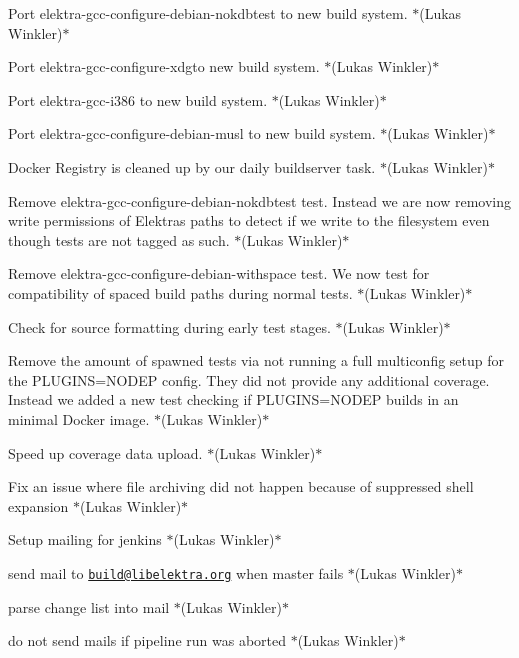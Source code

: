 \begin{DoxyItemize}
\item Port {\ttfamily elektra-\/gcc-\/configure-\/debian-\/nokdbtest} to new build system. $\ast$(Lukas Winkler)$\ast$
\item Port {\ttfamily elektra-\/gcc-\/configure-\/xdg}to new build system. $\ast$(Lukas Winkler)$\ast$
\item Port {\ttfamily elektra-\/gcc-\/i386} to new build system. $\ast$(Lukas Winkler)$\ast$
\item Port {\ttfamily elektra-\/gcc-\/configure-\/debian-\/musl} to new build system. $\ast$(Lukas Winkler)$\ast$
\item Docker Registry is cleaned up by our daily buildserver task. $\ast$(Lukas Winkler)$\ast$
\item Remove {\ttfamily elektra-\/gcc-\/configure-\/debian-\/nokdbtest} test. Instead we are now removing write permissions of Elektra\textquotesingle{}s paths to detect if we write to the filesystem even though tests are not tagged as such. $\ast$(Lukas Winkler)$\ast$
\item Remove {\ttfamily elektra-\/gcc-\/configure-\/debian-\/withspace} test. We now test for compatibility of spaced build paths during normal tests. $\ast$(Lukas Winkler)$\ast$
\item Check for source formatting during early test stages. $\ast$(Lukas Winkler)$\ast$
\item Remove the amount of spawned tests via not running a full multiconfig setup for the {\ttfamily P\+L\+U\+G\+I\+NS=N\+O\+D\+EP} config. They did not provide any additional coverage. Instead we added a new test checking if {\ttfamily P\+L\+U\+G\+I\+NS=N\+O\+D\+EP} builds in an minimal Docker image. $\ast$(Lukas Winkler)$\ast$
\item Speed up coverage data upload. $\ast$(Lukas Winkler)$\ast$
\item Fix an issue where file archiving did not happen because of suppressed shell expansion $\ast$(Lukas Winkler)$\ast$
\item Setup mailing for jenkins $\ast$(Lukas Winkler)$\ast$
\begin{DoxyItemize}
\item send mail to \href{mailto:build@libelektra.org}{\tt build@libelektra.\+org} when {\ttfamily master} fails $\ast$(Lukas Winkler)$\ast$
\item parse change list into mail $\ast$(Lukas Winkler)$\ast$
\item do not send mails if pipeline run was aborted $\ast$(Lukas Winkler)$\ast$
\end{DoxyItemize}
\end{DoxyItemize}

